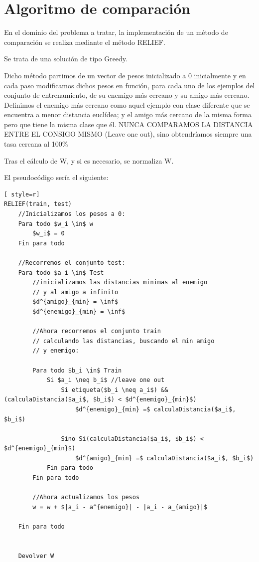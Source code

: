 \section{Algoritmo de comparación}
En el dominio del problema a tratar, la implementación de un método de comparación se realiza mediante el método RELIEF.

Se trata de una solución de tipo Greedy.

Dicho método partimos de un vector de pesos inicializado a 0 inicialmente y en cada paso modificamos dichos pesos en función, para cada uno de los ejemplos del conjunto de entrenamiento, de su enemigo más cercano y su amigo más cercano.\\ 

Definimos el enemigo más cercano como aquel ejemplo con clase diferente que se encuentra a menor distancia euclídea; y el amigo más cercano de la misma forma pero que tiene la misma clase que él.
NUNCA COMPARAMOS LA DISTANCIA ENTRE EL CONSIGO MISMO (Leave one out), sino obtendríamos siempre una tasa cercana al 100\%

Tras el cálculo de W, y si es necesario, se normaliza W.

El pseudocódigo sería el siguiente:




\begin{lstlisting}[ style=r]
RELIEF(train, test)
	//Inicializamos los pesos a 0:
	Para todo $w_i \in$ w
		$w_i$ = 0
	Fin para todo
	
	//Recorremos el conjunto test:
	Para todo $a_i \in$ Test
		//inicializamos las distancias minimas al enemigo
		// y al amigo a infinito
		$d^{amigo}_{min} = \inf$
		$d^{enemigo}_{min} = \inf$
		
		//Ahora recorremos el conjunto train
		// calculando las distancias, buscando el min amigo
		// y enemigo:
		
		Para todo $b_i \in$ Train
			Si $a_i \neq b_i$ //leave one out
				Si etiqueta($b_i \neq a_i$) && (calculaDistancia($a_i$, $b_i$) < $d^{enemigo}_{min}$)
					$d^{enemigo}_{min} =$ calculaDistancia($a_i$, $b_i$)
					
				Sino Si(calculaDistancia($a_i$, $b_i$) < $d^{enemigo}_{min}$)
					$d^{amigo}_{min} =$ calculaDistancia($a_i$, $b_i$)
			Fin para todo
		Fin para todo
		
		//Ahora actualizamos los pesos
		w = w + $|a_i - a^{enemigo}| - |a_i - a_{amigo}|$
		
	Fin para todo
	
	
	Devolver W
\end{lstlisting}


